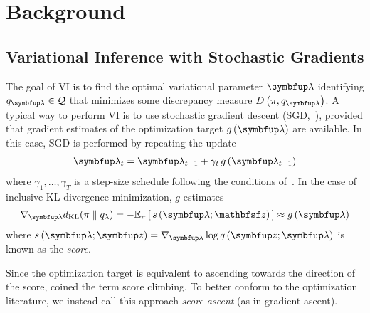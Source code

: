 
\section{Background}
\subsection{Variational Inference with Stochastic Gradients}\label{section:ivi_previous}
The goal of VI is to find the optimal variational parameter \(\vlambda\) identifying \(q_{\vlambda} \in \mathcal{Q}\) that minimizes some discrepancy measure \(D\left(\pi, q_{\vlambda}\right)\).
A typical way to perform VI is to use stochastic gradient descent (SGD,~\citealt{robbins_stochastic_1951}), provided that gradient estimates of the optimization target \(g\,(\vlambda)\) are available.
In this case, SGD is performed by repeating the update
\begin{align*}
  \vlambda_{t} = \vlambda_{t-1} + \gamma_{t} \, g\left(\vlambda_{t-1}\right)
\end{align*}
where \(\gamma_1, \ldots, \gamma_T\) is a step-size schedule following the conditions of~\citet{robbins_stochastic_1951, bottou_online_1999}.
In the case of inclusive KL divergence minimization, \(g\) estimates
%
{
\begin{align*}
  \nabla_{\vlambda} \DKL{\pi}{q_{\lambda}}
  = -\Esub{\pi}{ s\,(\vlambda; \rvvz) } 
  \approx g\left(\vlambda\right)
\end{align*}
}%
%
where \(s\,(\vlambda;\vz) = \nabla_{\vlambda} \log q\,(\vz; \vlambda)\) is known as the \textit{score}.

Since the optimization target is equivalent to ascending towards the direction of the score, \citet{NEURIPS2020_b2070693} coined the term score climbing.
To better conform to the optimization literature, we instead call this approach \textit{score ascent} (as in gradient ascent).

